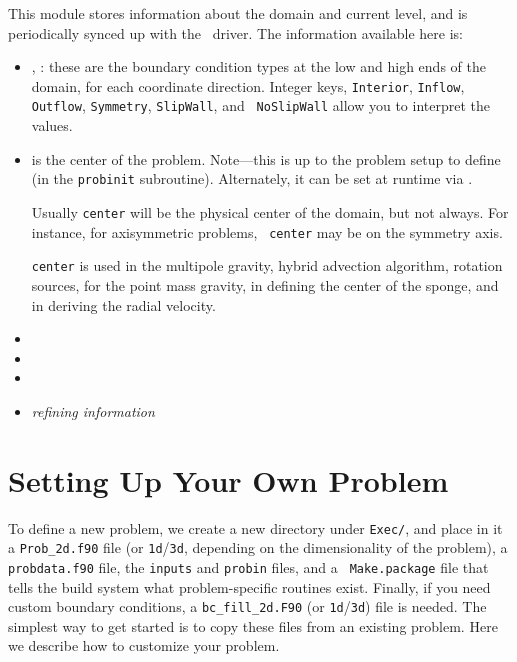\begin{itemize}
  This module stores information about the domain and current level,
  and is periodically synced up with the \cpp\ driver.  The information
  available here is:
  \begin{itemize}
  \item {}, : these are the boundary
    condition types at the low and high ends of the domain, for each
    coordinate direction.  Integer keys, {\tt Interior}, {\tt Inflow},
    {\tt Outflow}, {\tt Symmetry}, {\tt SlipWall}, and {\tt
      NoSlipWall} allow you to interpret the values.

  \item {} is the center of the problem.  Note---this is up
    to the problem setup to define (in the {\tt probinit} subroutine).
    Alternately, it can be set at runtime via
    . 

    Usually {\tt center} will be the physical center of the domain,
    but not always.  For instance, for axisymmetric problems, {\tt
      center} may be on the symmetry axis.

    {\tt center} is used in the multipole gravity, hybrid advection
    algorithm, rotation sources, for the point mass gravity, in
    defining the center of the sponge, and in deriving the radial
    velocity.  

  \item {}

  \item {}

  \item {}

  \item {\em refining information}

  \end{itemize}

\end{itemize}



\section{Setting Up Your Own Problem}

To define a new problem, we create a new directory under {\tt Exec/},
and place in it a {\tt Prob\_2d.f90} file (or {\tt 1d}/{\tt 3d},
depending on the dimensionality of the problem), a {\tt probdata.f90}
file, the {\tt inputs} and {\tt probin} files, and a {\tt
  Make.package} file that tells the build system what problem-specific
routines exist.  Finally, if you need custom boundary conditions, a
{\tt bc\_fill\_2d.F90} (or {\tt 1d}/{\tt 3d}) file is needed.  The
simplest way to get started is to copy these files from an existing
problem.  Here we describe how to customize your problem.

